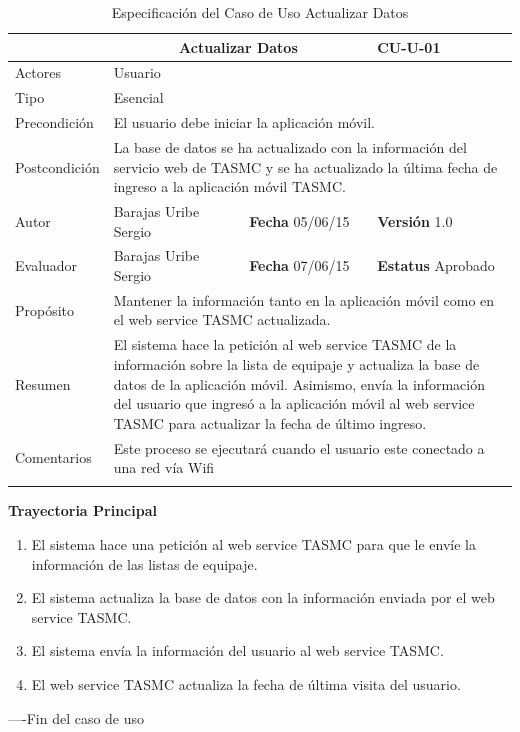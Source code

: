 \begin{longtable}[h]{|p{2.5cm}|p{6.4cm}|p{2cm}|p{2cm}|}
	\hline
		\rowcolor[RGB]{51,153,255}{Caso de Uso}&\multicolumn{2}{c}{Actualizar Datos}&{\textbf{CU-U-01}}\\
	\hline
		{Actores}&\multicolumn{3}{p{11.2cm}|}{Usuario}\\
	\hline
		{Tipo}&\multicolumn{3}{p{11.2cm}|}{Esencial}\\
	\hline
		{Precondición}&\multicolumn{3}{p{11.2cm}|}{El usuario debe iniciar la aplicación móvil.}\\
	\hline
		{Postcondición}&\multicolumn{3}{p{11.2cm}|}{La base de datos se ha actualizado con la información del servicio web de TASMC y se ha actualizado la última fecha de ingreso a la aplicación móvil TASMC.}\\
	\hline
		{Autor}&{Barajas Uribe Sergio}&{\textbf{Fecha} 05/06/15}&{\textbf{Versión} 1.0}\\
			\hline
		{Evaluador}&{Barajas Uribe Sergio}&{\textbf{Fecha} 07/06/15}&{\textbf{Estatus} Aprobado}\\
	\hline
		{Propósito}&\multicolumn{3}{p{11.2cm}|}{Mantener la información tanto en la aplicación móvil como en el web service TASMC actualizada.}\\
	\hline
		{Resumen}&\multicolumn{3}{p{11.2cm}|}{El sistema hace la petición al web service TASMC de la información sobre la lista de equipaje y actualiza la base de datos de la aplicación móvil. Asimismo, envía la información del usuario que ingresó a la aplicación móvil al web service TASMC para actualizar la fecha de último ingreso.}\\	
	\hline
		{Comentarios}&\multicolumn{3}{p{11.2cm}|}{Este proceso se ejecutará cuando el usuario este conectado a una red vía Wifi}\\	
	\hline
	\caption[Especificación del Caso de Uso Actualizar Datos]{Especificación del Caso de Uso Actualizar Datos}
    	\label{tab:cuActualizarDatos}
\end{longtable}
\newpage
\begin{flushleft}
	\textbf{Trayectoria Principal}\\
	\begin{enumerate}
		\item El sistema hace una petición al web service TASMC para que le envíe la información de las listas de equipaje.
		\item El sistema actualiza la base de datos con la información enviada por el web service TASMC.
		\item El sistema envía la información del usuario al web service TASMC.
		\item El web service TASMC actualiza la fecha de última visita del usuario.
	\end{enumerate}
\end{flushleft}
----Fin del caso de uso
\newpage

